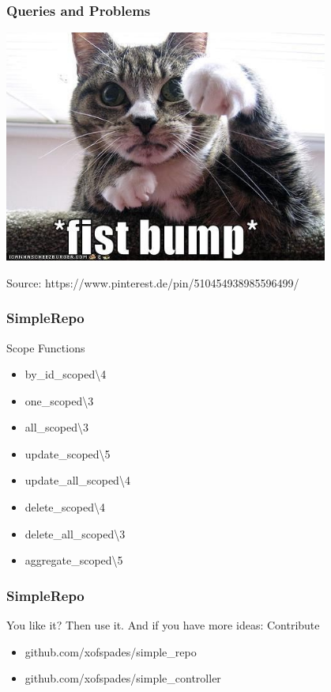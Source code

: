 \documentclass{beamer}
\begin{document}

\begin{frame}[fragile]
\frametitle{Queries and Problems}
\centerline{\includegraphics[width=0.8\textwidth]{fist_bump.jpg}}
\begin{tiny}
\centerline{Source: https://www.pinterest.de/pin/510454938985596499/}
\end{tiny}
\end{frame}



\begin{frame}[fragile]
\frametitle{SimpleRepo}
\centerline{Scope Functions}
\begin{itemize}
\item by\_id\_scoped\textbackslash4
\item one\_scoped\textbackslash3
\item all\_scoped\textbackslash3
\item update\_scoped\textbackslash5
\item update\_all\_scoped\textbackslash4
\item delete\_scoped\textbackslash4
\item delete\_all\_scoped\textbackslash3
\item aggregate\_scoped\textbackslash5
\end{itemize}
\end{frame}


\begin{frame}[fragile]
\frametitle{SimpleRepo}
\centerline{You like it? Then use it. And if you have more ideas: Contribute}
\begin{itemize}
\item github.com/xofspades/simple\_repo
\pause
\item github.com/xofspades/simple\_controller
\end{itemize}
\end{frame}
\end{document}
